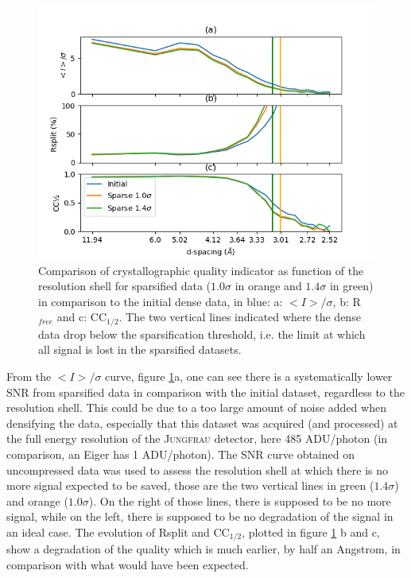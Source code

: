 \documentclass[preprint]{iucr}              %
\begin{document}
\begin{figure}
\label{f-NQO1}
\includegraphics[width=12cm]{NQO1/NQO1}
\caption{Comparison of crystallographic quality indicator as function of the resolution shell for sparsified data ($1.0\sigma$ in orange and $1.4\sigma$ in green) in comparison to the initial dense data, in blue:
a: $<I>/\sigma$, b: R$_{free}$ and c: CC$_{1/2}$.
The two vertical lines indicated where the dense data drop below the sparsification threshold, i.e. the limit at which all signal is lost in the sparsified datasets.  }
\end{figure}

From the $<I>/\sigma$ curve, figure \ref{f-NQO1}a, one can see there is a systematically lower SNR from sparsified data in comparison with the initial dataset, regardless to the resolution shell. 
This could be due to a too large amount of noise added when densifying the data, especially that this dataset was acquired (and processed) at the full energy resolution of the \textsc{Jungfrau} detector, here 485 ADU/photon (in comparison, an Eiger has 1 ADU/photon).
The SNR curve obtained on uncompressed data was used to assess the resolution shell at which there is no more signal expected to be saved, those are the two vertical lines in green ($1.4\sigma$) and 
orange ($1.0\sigma$). 
On the right of those lines, there is supposed to be no more signal, while on the left, there is supposed to be no degradation of the signal in an ideal case.
The evolution of Rsplit and CC$_{1/2}$, plotted in figure \ref{f-NQO1} b and c, show a degradation 
of the quality which is much earlier, by half an Angstrom, in comparison with what would have been expected. 
\end{document}
